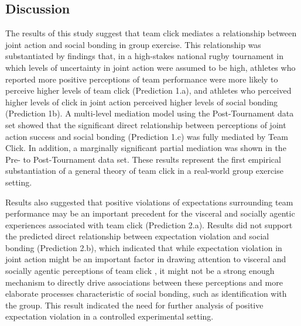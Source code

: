 \begin{CJK}{UTF8}{gbsn}
\clearpage

\section{Discussion}
The results of this study suggest that team click mediates a relationship between joint action and social bonding in group exercise.  This relationship was substantiated by findings that, in a high-stakes national rugby tournament in which levels of uncertainty in joint action were assumed to be high, athletes who reported more positive perceptions of team performance were more likely to perceive higher levels of team click (Prediction 1.a), and athletes who perceived higher levels of click in joint action perceived higher levels of social bonding (Prediction 1b).  A multi-level mediation model using the Post-Tournament data set showed that the significant direct relationship between perceptions of joint action success and social bonding (Prediction 1.c) was fully mediated by Team Click. In addition, a marginally significant partial mediation was shown in the Pre- to Post-Tournament data set.  These results represent the first empirical substantiation of a general theory of team click in a real-world group exercise setting.


Results also suggested that positive violations of expectations surrounding team performance may be an important precedent for the visceral and socially agentic experiences associated with team click (Prediction 2.a).  Results did not support the predicted direct relationship between expectation violation and social bonding (Prediction 2.b), which indicated that while expectation violation in joint action might be an important factor in drawing attention to visceral and socially agentic perceptions of team click \citep{Chietkrov2014,Clark2015}, it might not be a strong enough mechanism to directly drive associations between these perceptions and more elaborate processes characteristic of social bonding, such as identification with the group. This result indicated the need for further analysis of positive expectation violation in a controlled experimental setting.



\end{CJK}
